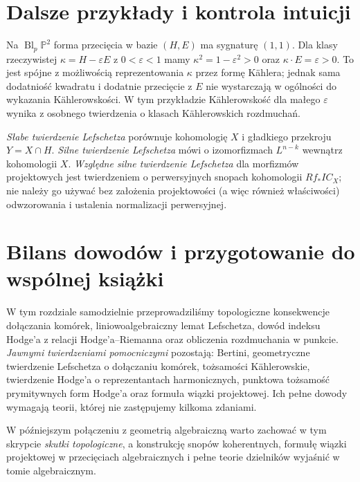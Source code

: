 \section{Dalsze przykłady i kontrola intuicji}
\begin{przyklad}
Na $\operatorname{Bl}_p\mathbb P^2$ forma przecięcia w bazie
$(H,E)$ ma sygnaturę $(1,1)$. Dla klasy rzeczywistej
$\kappa=H-\varepsilon E$ z $0<\varepsilon<1$ mamy
$\kappa^2=1-\varepsilon^2>0$ oraz
$\kappa\cdot E=\varepsilon>0$.
To jest spójne z możliwością reprezentowania $\kappa$
przez formę Kählera; jednak sama dodatniość kwadratu
i dodatnie przecięcie z $E$ nie wystarczają w ogólności
do wykazania Kählerowskości. W tym przykładzie
Kählerowskość dla małego $\varepsilon$ wynika z osobnego
twierdzenia o klasach Kählerowskich rozdmuchań.
\end{przyklad}
\begin{przyklad}
\emph{Słabe twierdzenie Lefschetza} porównuje kohomologię $X$ i gładkiego
przekroju $Y=X\cap H$. \emph{Silne twierdzenie Lefschetza} mówi o
izomorfizmach $L^{n-k}$ wewnątrz kohomologii $X$.
\emph{Względne silne twierdzenie Lefschetza} dla morfizmów
projektowych jest twierdzeniem o perwersyjnych snopach kohomologii
$Rf_*IC_X$; nie należy go używać bez założenia
projektowości (a więc również właściwości) odwzorowania
i ustalenia normalizacji perwersyjnej.
\end{przyklad}

\section{Bilans dowodów i przygotowanie do wspólnej książki}
W tym rozdziale samodzielnie przeprowadziliśmy topologiczne
konsekwencje dołączania komórek, liniowoalgebraiczny lemat
Lefschetza, dowód indeksu Hodge'a z relacji
Hodge'a--Riemanna oraz obliczenia rozdmuchania w punkcie.
\emph{Jawnymi twierdzeniami pomocniczymi} pozostają:
Bertini, geometryczne twierdzenie Lefschetza o dołączaniu
komórek, tożsamości Kählerowskie, twierdzenie Hodge'a
o reprezentantach harmonicznych, punktowa tożsamość
prymitywnych form Hodge'a oraz formuła wiązki projektowej.
Ich pełne dowody wymagają teorii, której nie zastępujemy
kilkoma zdaniami.

W późniejszym połączeniu z geometrią algebraiczną
warto zachować w tym skrypcie \emph{skutki topologiczne},
a konstrukcję snopów koherentnych, formułę wiązki
projektowej w przecięciach algebraicznych i pełne
teorie dzielników wyjaśnić w tomie algebraicznym.

